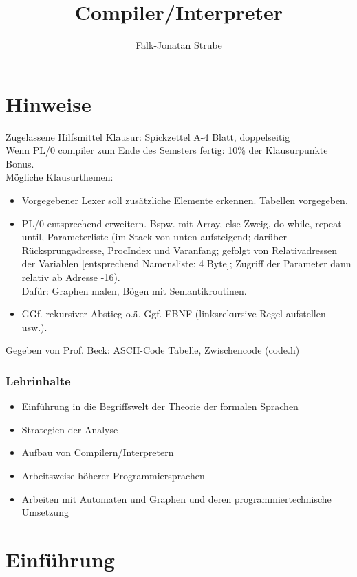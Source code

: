 \documentclass{scrreprt}
\title{Compiler/Interpreter}
\author{Falk-Jonatan Strube}
\begin{document}
\maketitle
\tableofcontents

\chapter*{Hinweise}

Zugelassene Hilfsmittel Klausur: Spickzettel A-4 Blatt, doppelseitig\\
Wenn PL/0 compiler zum Ende des Semsters fertig: 10\% der Klausurpunkte Bonus.\\
Mögliche Klausurthemen:
\begin{itemize}
\item Vorgegebener Lexer soll zusätzliche Elemente erkennen. Tabellen vorgegeben.
\item PL/0 entsprechend erweitern. Bspw. mit Array, else-Zweig, do-while, repeat-until, Parameterliste (im Stack von unten aufsteigend; darüber Rücksprungadresse, ProcIndex und Varanfang; gefolgt von Relativadressen der Variablen [entsprechend Namensliste: 4 Byte]; Zugriff der Parameter dann relativ ab Adresse -16).\\
Dafür: Graphen malen, Bögen mit Semantikroutinen.
\item GGf. rekursiver Abstieg o.ä. Ggf. EBNF (linksrekursive Regel aufstellen usw.).
\end{itemize}
Gegeben von Prof. Beck: ASCII-Code Tabelle, Zwischencode (code.h)

\subsection*{Lehrinhalte}
\begin{itemize}
\item Einführung in die Begriffswelt der Theorie der formalen Sprachen
\item Strategien der Analyse
\item Aufbau von Compilern/Interpretern
\item Arbeitsweise höherer Programmiersprachen
\item Arbeiten mit Automaten und Graphen und deren programmiertechnische Umsetzung
\end{itemize}

\chapter{Einführung}

\end{document}
